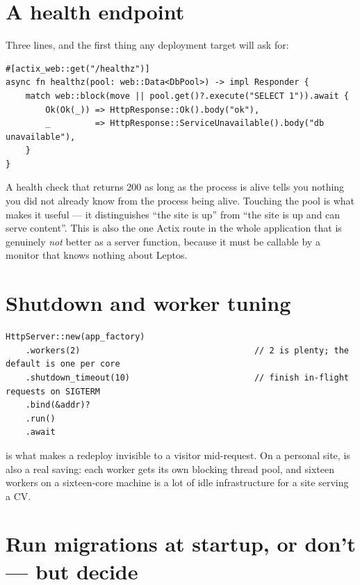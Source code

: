 \section{A health endpoint}

Three lines, and the first thing any deployment target will ask for:

\begin{lstlisting}[style=rs]
#[actix_web::get("/healthz")]
async fn healthz(pool: web::Data<DbPool>) -> impl Responder {
    match web::block(move || pool.get()?.execute("SELECT 1")).await {
        Ok(Ok(_)) => HttpResponse::Ok().body("ok"),
        _         => HttpResponse::ServiceUnavailable().body("db unavailable"),
    }
}
\end{lstlisting}

\begin{pattern}
A health check that returns 200 as long as the process is alive tells you nothing you did not
already know from the process being alive. Touching the pool is what makes it useful --- it
distinguishes ``the site is up'' from ``the site is up and can serve content''. This is also the
one Actix route in the whole application that is genuinely \emph{not} better as a server function,
because it must be callable by a monitor that knows nothing about Leptos.
\end{pattern}

\section{Shutdown and worker tuning}

\begin{lstlisting}[style=rs]
HttpServer::new(app_factory)
    .workers(2)                                   // 2 is plenty; the default is one per core
    .shutdown_timeout(10)                         // finish in-flight requests on SIGTERM
    .bind(&addr)?
    .run()
    .await
\end{lstlisting}

 is what makes a redeploy invisible to a visitor mid-request. On a personal
site,  is also a real saving: each worker gets its own blocking thread pool, and
sixteen workers on a sixteen-core machine is a lot of idle infrastructure for a site serving a CV.

\section{Run migrations at startup, or don't --- but decide}

